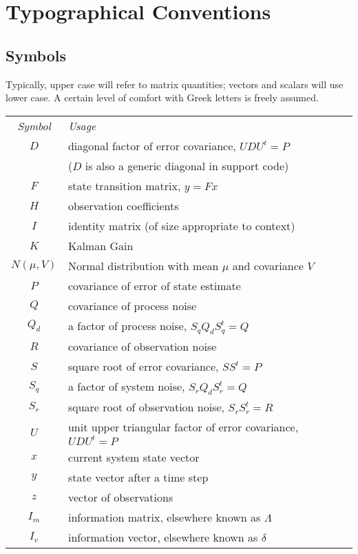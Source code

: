\section{Typographical Conventions}

\subsection{Symbols}

Typically, upper case will refer to matrix quantities;
vectors and scalars will use lower case.
A certain level of comfort with Greek letters
is freely assumed.

\begin{tabular}{cl}
   {\it Symbol} & {\it Usage}
\\ $D$          & diagonal factor of error covariance,
                        $U D U^t = P$
\\              & ($D$ is also a generic diagonal in support code)
\\ $F$          & state transition matrix,
                        $y = F x$
\\ $H$          & observation coefficients
\\ $I$          & identity matrix (of size appropriate to context)
\\ $K$          & Kalman Gain
\\ $N(\mu,V)$   & Normal distribution with mean $\mu$ and covariance $V$
\\ $P$          & covariance of error of state estimate
\\ $Q$          & covariance of process noise
\\ $Q_d$        & a factor of process noise,
                        $S_q Q_d S_q^t = Q$
\\ $R$          & covariance of observation noise
\\ $S$          & square root of error covariance,
                        $S S^t = P$
\\ $S_q$        & a factor of system noise,
                        $S_r Q_d S_r^t = Q$
\\ $S_r$        & square root of observation noise,
                        $S_r S_r^t = R$
\\ $U$          & unit upper triangular factor of error covariance,
                        $U D U^t = P$
\\ $x$          & current system state vector
\\ $y$          & state vector after a time step
\\ $z$          & vector of observations
\\ $I_m$        & information matrix,
                        elsewhere known as $\Lambda$
\\ $I_v$        & information vector,
                        elsewhere known as $\delta$
\end{tabular}

